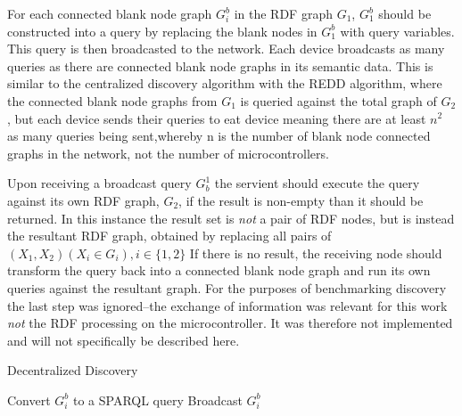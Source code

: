 For each connected blank node graph $G_i^{b}$ in the RDF graph $G_1$, $G_1^{b}$ should be constructed into a query by replacing the blank nodes in $G^{b}_{1}$ with query variables. This query is then broadcasted to the network. Each device broadcasts as many queries as there are connected blank node graphs in its semantic data. This is similar to the centralized discovery algorithm with the REDD algorithm, where the connected blank node graphs from $G_1$ is queried against the total graph of $G_2$, but each device sends their queries to eat device meaning there are at least $n^2$ as many queries being sent,whereby n is the number of blank node connected graphs in the network, not the number of microcontrollers. 

Upon receiving a broadcast query $G_b^1$ the servient should execute the query against its own RDF graph, $G_{2}$, if the result is non-empty than it should be returned. In this instance the result set is \textit{not} a pair of RDF nodes, but is instead the resultant RDF graph, obtained by replacing all pairs of $(X_1, X_2) (X_i \in G_i), i \in \{1,2\}$ If there is no result, the receiving node should transform the query back into a connected blank node graph and run its own queries against the resultant graph. For the purposes of benchmarking discovery the last step was ignored--the exchange of information was relevant for this work \textit{not} the RDF processing on the microcontroller. It was therefore not implemented and will not specifically be described here.


\begin{algorithm}
  \caption{Decentralized Discovery}\label{alg:decentralized}
  \begin{algorithmic}[1]
      	\State Convert $G^{b}_{i}$ to a SPARQL query
        \State Broadcast $G^{b}_{i}$
      \EndFor
    \EndProcedure
  \end{algorithmic}
\end{algorithm}